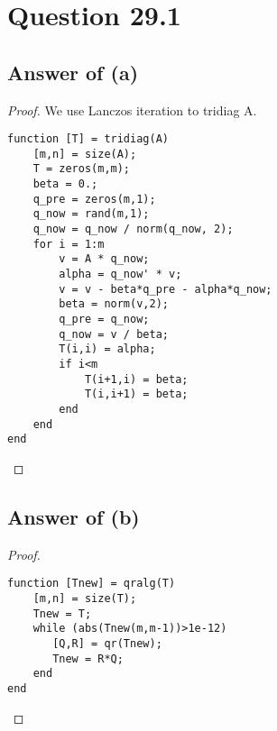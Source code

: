 \documentclass[letterpaper,11pt\iffalse ,draft\fi]{article}
\begin{document}
\newpage

\section*{Question 29.1}

\subsection*{Answer of (a)}
\begin{proof}

We use Lanczos iteration to tridiag A.

\begin{lstlisting}
function [T] = tridiag(A)
    [m,n] = size(A);
    T = zeros(m,m);
    beta = 0.;
    q_pre = zeros(m,1);
    q_now = rand(m,1);
    q_now = q_now / norm(q_now, 2);
    for i = 1:m
        v = A * q_now;
        alpha = q_now' * v;
        v = v - beta*q_pre - alpha*q_now;
        beta = norm(v,2);
        q_pre = q_now;
        q_now = v / beta;
        T(i,i) = alpha;
        if i<m
            T(i+1,i) = beta;
            T(i,i+1) = beta;
        end
    end
end
\end{lstlisting} \end{proof}


\subsection*{Answer of (b)}
\begin{proof}

\begin{lstlisting}
function [Tnew] = qralg(T)
    [m,n] = size(T);
    Tnew = T;
    while (abs(Tnew(m,m-1))>1e-12)
       [Q,R] = qr(Tnew);
       Tnew = R*Q;
    end
end
\end{lstlisting}

\end{proof}
\end{document}
